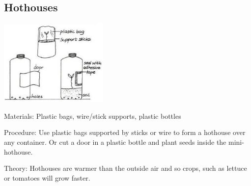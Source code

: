 \begin{multicols}{2}
\subsection{Hothouses} 

\begin{center}
\includegraphics[width=0.4\textwidth]{./img/vso/hothouses.jpg}
\end{center}

\begin{description*}
\item[Materials:]{Plastic bags, wire/stick supports, plastic bottles}
\item[Procedure:]{Use plastic bags supported by
sticks or wire to form a hothouse
over any container. Or cut a door in a plastic bottle and
plant seeds inside the mini-hothouse.}
\item[Theory:]{Hothouses are warmer than the
outside air and so crops, such as
lettuce or tomatoes will grow
faster.}
\end{description*}



\end{multicols}

\pagebreak